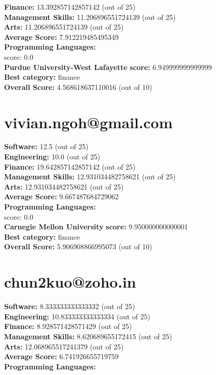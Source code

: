\documentclass{article}
\begin{document}
\textbf{Finance:} 13.392857142857142 (out of 25)\\
\textbf{Management Skills:} 11.206896551724139 (out of 25)\\
\textbf{Arts:} 11.206896551724139 (out of 25)\\
\textbf{Average Score: } 7.912219485495349\\
\textbf{Programming Languages:} \\
score: 0.0\\
\textbf{Purdue University-West Lafayette} \textbf{score:} 6.949999999999999\\
\textbf{Best category: } finance\\
\textbf{Overall Score: }4.568618637110016 (out of 10)\section{vivian.ngoh@gmail.com}
\textbf{Software:} 12.5 (out of 25)\\
\textbf{Engineering: } 10.0 (out of 25)\\
\textbf{Finance:} 19.642857142857142 (out of 25)\\
\textbf{Management Skills:} 12.931034482758621 (out of 25)\\
\textbf{Arts:} 12.931034482758621 (out of 25)\\
\textbf{Average Score: } 9.667487684729062\\
\textbf{Programming Languages:} \\
score: 0.0\\
\textbf{Carnegie Mellon University} \textbf{score:} 9.950000000000001\\
\textbf{Best category: } finance\\
\textbf{Overall Score: }5.906908866995073 (out of 10)\section{chun2kuo@zoho.in}
\textbf{Software:} 8.333333333333332 (out of 25)\\
\textbf{Engineering: } 10.833333333333334 (out of 25)\\
\textbf{Finance:} 8.928571428571429 (out of 25)\\
\textbf{Management Skills:} 8.620689655172415 (out of 25)\\
\textbf{Arts:} 12.068965517241379 (out of 25)\\
\textbf{Average Score: } 6.741926655719759\\
\textbf{Programming Languages:} \\
\end{document}
